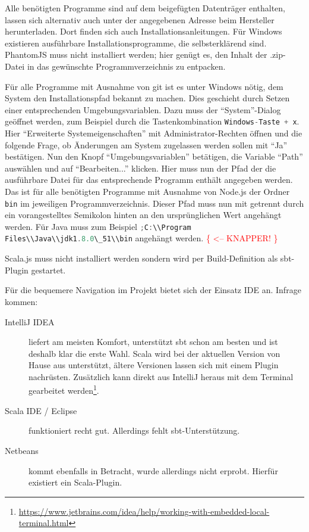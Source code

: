 \documentclass[a4paper, 12pt, hidelinks, listof=totoc, listoftables=totoc, bibliography=totoc]{scrreprt}
\newcommand{\code}[1]{\lstinline[language=Scala, style=inline]|#1|}
\newcommand{\TODOi}[1]{\textcolor{red}{\{#1\}}}
\begin{document}
Alle benötigten Programme sind auf dem beigefügten Datenträger enthalten, lassen sich alternativ auch unter der angegebenen Adresse beim Hersteller herunterladen. Dort finden sich auch Installationsanleitungen. Für Windows existieren ausführbare Installationsprogramme, die selbsterklärend sind. PhantomJS muss nicht installiert werden; hier genügt es, den Inhalt der .zip-Datei in das gewünschte Programmverzeichnis zu entpacken.

Für alle Programme mit Ausnahme von git ist es unter Windows nötig, dem System den Installationspfad bekannt zu machen. Dies geschieht durch Setzen einer entsprechenden Umgebungsvariablen. Dazu muss der "`System"'-Dialog geöffnet werden, zum Beispiel durch die Tastenkombination \code{Windows-Taste + x}. Hier "`Erweiterte Systemeigenschaften"' mit Administrator-Rechten öffnen und die folgende Frage, ob Änderungen am System zugelassen werden sollen mit "`Ja"' bestätigen. Nun den Knopf "`Umgebungsvariablen"' betätigen, die Variable "`Path"' auswählen und auf "`Bearbeiten..."' klicken. Hier muss nun der Pfad der die ausführbare Datei für das entsprechende Programm enthält angegeben werden. Das ist für alle benötigten Programme mit Ausnahme von Node.js der Ordner \code{bin} im jeweiligen Programmverzeichnis. Dieser Pfad muss nun mit getrennt durch ein vorangestelltes Semikolon hinten an den ursprünglichen Wert angehängt werden. Für Java muss zum Beispiel \code{;C:\\Program Files\\Java\\jdk1.8.0\_51\\bin} angehängt werden. \TODOi{ <-- KNAPPER! }

Scala.js muss nicht installiert werden sondern wird per Build-Definition als sbt-Plugin gestartet.

Für die bequemere Navigation im Projekt bietet sich der Einsatz \ac{IDE} an. Infrage kommen:

\begin{description}
	\item[IntelliJ IDEA] liefert am meisten Komfort, unterstützt sbt schon am besten und ist deshalb klar die erste Wahl. Scala wird bei der aktuellen Version von Hause aus unterstützt, ältere Versionen lassen sich mit einem Plugin nachrüsten. Zusätzlich kann direkt aus IntelliJ heraus mit dem Terminal gearbeitet werden\footnote{\url{https://www.jetbrains.com/idea/help/working-with-embedded-local-terminal.html}}.
	
	
	\item[Scala IDE / Eclipse] funktioniert recht gut. Allerdings fehlt sbt-Unterstützung.
	\item[Netbeans] kommt ebenfalls in Betracht, wurde allerdings nicht erprobt. Hierfür existiert ein Scala-Plugin.
\end{description}
\end{document}
